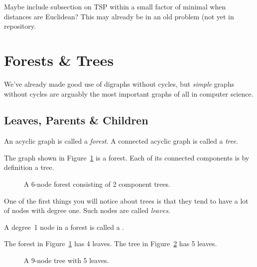 \begin{editingnotes}
Maybe include subsection on TSP within a small factor of minimal when
distances are Euclidean?  This may already be in an old problem (not yet in repository.
\end{editingnotes}

\section{Forests \& Trees}\label{trees-sec}
We've already made good use of digraphs without cycles, but
\emph{simple} graphs without cycles are arguably the most important
graphs of all in computer science.

\iffalse
As we have just seen, finding good cycles in a graph can be trickier than
you might first think.  But what if a graph has no cycles at all?  Sounds
pretty dull.
  But graphs without cycles, called \emph{acyclic graphs}, are
probably the most important graphs of all when it comes to computer
science.\fi

\subsection{Leaves, Parents \& Children}

\begin{definition}\label{def:tree}
An acyclic graph is called a \emph{forest}.  A connected acyclic graph
is called a \emph{tree}.
\end{definition}

The graph shown in Figure~\ref{fig:5I} is a forest.  Each of its
connected components is by definition a tree.

\begin{figure}


\caption{A 6-node forest consisting of 2 component trees.}
\label{fig:5I}
\end{figure}

One of the first things you will notice about trees is that they tend
to have a lot of nodes with degree one.  Such nodes are called
\emph{leaves}.

\begin{definition}
A degree~1 node in a forest is called a .
\end{definition}

The forest in Figure~\ref{fig:5I} has 4 leaves.  The tree in
Figure~\ref{fig:5H} has 5 leaves.
\begin{figure}


\caption{A 9-node tree with 5 leaves.}

\label{fig:5H}
\end{figure}

